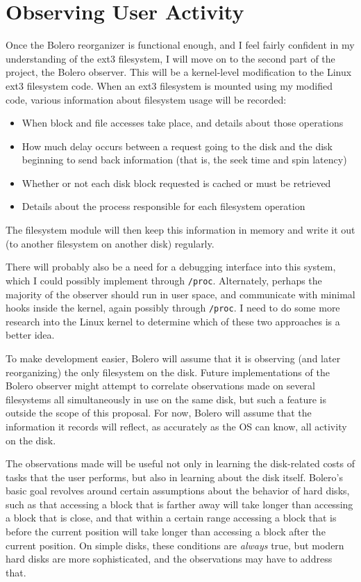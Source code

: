 \documentclass[10pt,twocolumn]{article}
\begin{document}
\section{Observing User Activity}

Once the Bolero reorganizer is functional enough, and I feel fairly confident in
my understanding of the ext3 filesystem, I will move on to the second part of
the project, the Bolero observer. This will be a kernel-level modification
to the Linux ext3 filesystem code. When an ext3 filesystem is mounted using
my modified code, various information about filesystem usage will be recorded:
\begin{itemize}
\item When block and file accesses take place, and details about those operations
\item How much delay occurs between a request going to the disk and the disk
beginning to send back information (that is, the seek time and spin latency)
\item Whether or not each disk block requested is cached or must be retrieved
\item Details about the process responsible for each filesystem operation
\end{itemize}
The filesystem module will then keep this information in memory and write it out
(to another filesystem on another disk) regularly.

There will probably also be a need for a debugging interface into this system,
which I could possibly implement through \texttt{/proc}. Alternately, perhaps the
majority of the observer should run in user space, and
communicate with minimal hooks inside the kernel, again possibly through \texttt{/proc}.
I need to do some more research into the Linux kernel to determine which of
these two approaches is a better idea.

To make development easier, Bolero will assume that it is observing (and
later reorganizing) the only filesystem on the disk. Future implementations of the
Bolero observer might attempt to correlate observations
made on several filesystems all simultaneously in use on the same disk, but
such a feature is outside the scope of this proposal. For now, Bolero will assume that
the information it records will reflect, as accurately as the OS can know,
all activity on the disk.

The observations made will be useful not only in learning the disk-related costs of tasks
that the user performs, but also in learning about the disk itself. Bolero's basic goal revolves
around certain assumptions about the behavior of hard disks, such as that accessing
a block that is farther away will take longer than accessing a block that is close, and
that within a certain range accessing a block that is before the current position will take longer than
accessing a block after the current position. On simple disks, these conditions are
\emph{always} true, but modern hard disks are more sophisticated, and the observations
may have to address that.
\end{document}

